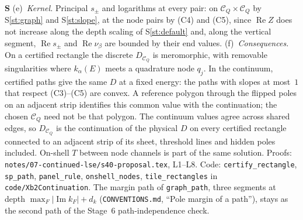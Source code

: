 \documentclass[11pt]{article}
\newcommand{\file}[1]{\nolinkurl{#1}}
\newcounter{stmt}
\newenvironment{stmt}[1]{\par\smallskip\refstepcounter{stmt}\noindent\textbf{S\thestmt}\enspace[\textsf{#1}]\enspace\ignorespaces}{\par\smallskip}
\newcommand{\Sr}[1]{S\ref{#1}}
\begin{document}
\begin{stmt}{definition}
(e)~\emph{Kernel.} Principal $s_\pm$ and logarithms at every pair: on $\mathcal C_Q\times\mathcal C_Q$ by \Sr{st:graph} and \Sr{st:slope}, at the node pairs by (C4) and (C5), since $\operatorname{Re}Z$ does not increase along the depth scaling of \Sr{st:default} and, along the vertical segment, $\operatorname{Re}s_\pm$ and $\operatorname{Re}\nu_\beta$ are bounded by their end values.
(f)~\emph{Consequences.} On a certified rectangle the discrete $D_{\mathcal C_Q}$ is meromorphic, with removable singularities where $k_\alpha(E)$ meets a quadrature node $q_j$. In the continuum, certified paths give the same $D$ at a fixed energy: the paths with slopes at most~$1$ that respect (C3)--(C5) are convex. A reference polygon through the flipped poles on an adjacent strip identifies this common value with the continuation; the chosen $\mathcal C_Q$ need not be that polygon. The continuum values agree across shared edges, so $D_{\mathcal C_Q}$ is the continuation of the physical $D$ on every certified rectangle connected to an adjacent strip of its sheet, threshold lines and hidden poles included. On-shell $T$ between node channels is part of the same solution. Proofs: \file{notes/07-continued-lse/s40-proposal.tex}, L1--L8. Code: \texttt{certify\_rectangle}, \texttt{sp\_path}, \texttt{panel\_rule}, \texttt{onshell\_nodes}, \texttt{tile\_rectangles} in \file{code/Xb2Continuation}. The margin path of \texttt{graph\_path}, three segments at depth $\max_F|\operatorname{Im}k_F|+d_k$ (\file{CONVENTIONS.md}, ``Pole margin of a path''), stays as the second path of the Stage~6 path-independence check.
\end{stmt}
\end{document}

